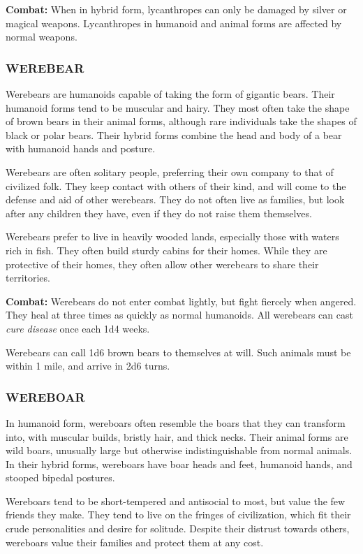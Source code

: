 \begin{multicols}{2}
\textbf{Combat:} When in hybrid form, lycanthropes can only be damaged by silver or magical weapons. Lycanthropes in humanoid and animal forms are affected by normal weapons.

\subsubsection{WEREBEAR}

Werebears are humanoids capable of taking the form of gigantic bears. Their humanoid forms tend to be muscular and hairy. They most often take the shape of brown bears in their animal forms, although rare individuals take the shapes of black or polar bears. Their hybrid forms combine the head and body of a bear with humanoid hands and posture.

Werebears are often solitary people, preferring their own company to that of civilized folk. They keep contact with others of their kind, and will come to the defense and aid of other werebears. They do not often live as families, but look after any children they have, even if they do not raise them themselves. 

Werebears prefer to live in heavily wooded lands, especially those with waters rich in fish. They often build sturdy cabins for their homes. While they are protective of their homes, they often allow other werebears to share their territories.

\textbf{Combat:} Werebears do not enter combat lightly, but fight fiercely when angered. They heal at three times as quickly as normal humanoids. All werebears can cast \textit{cure disease} once each 1d4 weeks.

Werebears can call 1d6 brown bears to themselves at will. Such animals must be within 1 mile, and arrive in 2d6 turns.

\subsubsection{WEREBOAR}

In humanoid form, wereboars often resemble the boars that they can transform into, with muscular builds, bristly hair, and thick necks. Their animal forms are wild boars, unusually large but otherwise indistinguishable from normal animals. In their hybrid forms, wereboars have boar heads and feet, humanoid hands, and stooped bipedal postures.

Wereboars tend to be short-tempered and antisocial to most, but value the few friends they make. They tend to live on the fringes of civilization, which fit their crude personalities and desire for solitude. Despite their distrust towards others, wereboars value their families and protect them at any cost.


\end{multicols}
